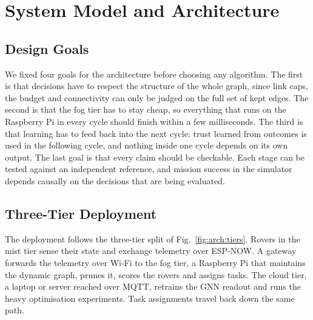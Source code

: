 \chapter{System Model and Architecture}
\label{ch:arch}

\section{Design Goals}

We fixed four goals for the architecture before choosing any algorithm. The
first is that decisions have to respect the structure of the whole graph,
since link caps, the budget and connectivity can only be judged on the full
set of kept edges. The second is that the fog tier has to stay cheap, so
everything that runs on the Raspberry Pi in every cycle should finish within a
few milliseconds. The third is that learning has to feed back into the next
cycle: trust learned from outcomes is used in the following cycle, and nothing
inside one cycle depends on its own output. The last goal is that every claim
should be checkable. Each stage can be tested against an independent
reference, and mission success in the simulator depends causally on the
decisions that are being evaluated.

\section{Three-Tier Deployment}

The deployment follows the three-tier split of Fig.~\ref{fig:arch:tiers}.
Rovers in the mist tier sense their state and exchange telemetry over
ESP-NOW. A gateway forwards the telemetry over Wi-Fi to the fog tier, a
Raspberry Pi that maintains the dynamic graph, prunes it, scores the rovers
and assigns tasks. The cloud tier, a laptop or server reached over MQTT,
retrains the GNN readout and runs the heavy optimisation experiments. Task
assignments travel back down the same path.

